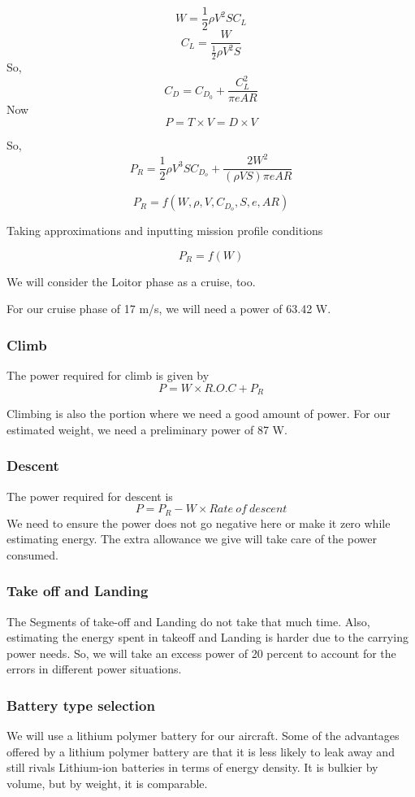 \documentclass[12 pt]{article}
\begin{document}
$$ W = \frac{1}{2} \rho V^2 S C_L $$
$$ C_L = \frac{W}{\frac{1}{2} \rho V^2 S}$$
So,
$$ C_D = C_{D_0} + \frac{C_L^2}{\pi e AR} $$
Now 
$$ P = T\times V = D\times V $$

So, 
$$ P_R = \frac{1}{2}\rho V^3 S C_{D_o} + \frac{2 W^2}{ (\rho V S) \pi e AR} $$

$$P_R = f(W,\rho,V,C_{D_o},S,e,AR)$$

Taking approximations and inputting mission profile conditions

$$ P_R = f(W) $$

We will consider the Loitor phase as a cruise, too.

For our cruise phase of 17 m/s, we will need a power of 63.42 W.

\subsubsection{Climb }
The power required for climb is given by 
$$ P = W \times R.O.C + P_R $$

Climbing is also the portion where we need a good amount of power. For our estimated weight, we need a preliminary power of 87 W.

\subsubsection{Descent}
The power required for descent is 
$$ P = P_R - W \times Rate\: of\: descent$$
We need to ensure the power does not go negative here or make it zero while estimating energy. The extra allowance we give will take care of the power consumed.

\subsubsection{Take off and Landing}
The Segments of take-off and Landing do not take that much time. Also, estimating the energy spent in takeoff and Landing is harder due to the carrying power needs. So, we will take an excess power of 20 percent to account for the errors in different power situations.

\subsubsection{Battery type selection \cite{Lipobattery}}

We will use a lithium polymer battery for our aircraft. Some of the advantages offered by a lithium polymer battery are that it is less likely to leak away and still rivals Lithium-ion batteries in terms of energy density. It is bulkier by volume, but by weight, it is comparable.
\end{document}
